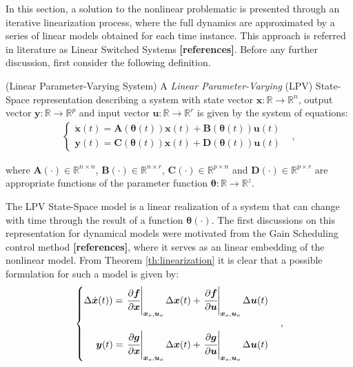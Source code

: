 \documentclass[a4paper,11pt]{book}
\numberwithin{figure}{chapter}
\numberwithin{equation}{chapter}
\numberwithin{table}{chapter}
\theoremstyle{definition}
\newtheorem{definition}{Definition}[chapter]
\newcounter{boxed-theorem}
\newcounter{boxed-definition}
\newenvironment{boxed-definition}[1]
{\begin{shaded} \begin{definition}{#1}}
{\end{definition} \end{shaded}}
\begin{document}
In this section, a solution to the nonlinear problematic is presented through an iterative linearization process, where the full dynamics are approximated by a series of linear models obtained for each time instance. This approach is referred in literature as Linear Switched Systems \textbf{[references]}. Before any further discussion, first consider the following definition.

\begin{boxed-definition}{(Linear Parameter-Varying System)} \label{def:lpv}
	A \textit{Linear Parameter-Varying} (LPV) State-Space representation describing a system with state vector $\bm{x} : \mathbb{R} \rightarrow \mathbb{R}^{n}$, output vector $\bm{y} : \mathbb{R} \rightarrow \mathbb{R}^{p}$ and input vector $\bm{u} : \mathbb{R} \rightarrow \mathbb{R}^{r}$ is given by the system of equations: 
    \begin{align} \label{eq:SSRepr04}
    \begin{cases}
        \dot{\bm{x}}(t) = \bm{A}(\bm{\theta}(t)) \bm{x}(t) + \bm{B}(\bm{\theta}(t)) \bm{u}(t) & \\
        \bm{y}(t) = \bm{C}(\bm{\theta}(t)) \bm{x}(t) + \bm{D}(\bm{\theta}(t)) \bm{u}(t) &
    \end{cases}
    ,\end{align}

    \noindent where $\bm{A}(\cdot) \in \mathbb{R}^{n \times n}$, $\bm{B}(\cdot) \in \mathbb{R}^{n \times r}$, $\bm{C}(\cdot) \in \mathbb{R}^{p \times n}$ and $\bm{D}(\cdot) \in \mathbb{R}^{p \times r}$ are appropriate functions of the parameter function $\bm{\theta} : \mathbb{R} \rightarrow \mathbb{R}^{z}$. 
\end{boxed-definition}

The LPV State-Space model is a linear realization of a system that can change with time through the result of a function $\bm{\theta}(\cdot)$. The first discussions on this representation for dynamical models were motivated from the Gain Scheduling control method \textbf{[references]}, where it serves as an linear embedding of the nonlinear model. From Theorem \ref{th:linearization} it is clear that a possible formulation for such a model is given by: 
\begin{equation}
\begin{cases}
        \Delta \dot{\bm{x}}(t)) =\left. \cfrac{\partial \bm{f}}{\partial \bm{x}}\right\vert_{\bm{x}_o, \bm{u}_o} \Delta \bm{x}(t) + \left. \cfrac{\partial \bm{f}}{\partial \bm{u}}\right\vert_{\bm{x}_o,  \bm{u}_o}  \Delta \bm{u}(t) \\ \\
        \hfill \bm{y}(t) = \left. \cfrac{\partial \bm{g}}{\partial \bm{x}}\right\vert_{\bm{x}_o, \bm{u}_o} \Delta \bm{x}(t) + \left. \cfrac{\partial \bm{g}}{\partial \bm{u}}\right\vert_{\bm{x}_o, \bm{u}_o} \Delta \bm{u}(t) \\
\end{cases}
,\end{equation}
\end{document}
